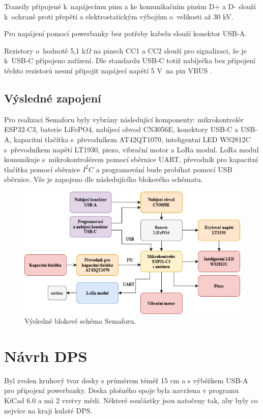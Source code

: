 Transily připojené k~napájecímu pinu a ke komunikačním pinům D+ a D- slouží k~ochraně proti přepětí a elektrostatickým výbojům o~velikosti až 30 kV. 

Pro napájení pomocí powerbanky bez potřeby kabelu slouží konektor USB-A. 

Rezistory o~hodnotě 5,1 k$\Omega$ na pinech CC1 a CC2 slouží pro signalizaci, že je k~USB-C připojeno zařízení. Dle standardu USB-C totiž nabíječka bez 
připojení těchto rezistorů nesmí připojit napájecí napětí 5 V~na pin VBUS \cite{USB-C}. 


\section{Výsledné zapojení}
Pro realizaci Semaforu byly vybrány následující komponenty: mikrokontrolér ESP32-C3, baterie LiFePO4, nabíjecí obvod CN3056E, konektory USB-C a USB-A,
kapacitní tlačítka s~převodníkem AT42QT1070, inteligentní LED WS2812C s~převodníkem napětí LT1930, piezo, vibrační motor a LoRa modul. LoRa modul komunikuje 
s~mikrokontrolérem pomocí sběrnice UART, převodník pro kapacitní tlačítka pomocí sběrnice $I^2C$ a programování bude probíhat pomocí USB sběrnice. Vše je 
zapojeno dle následujícího blokového schématu. 

\begin{figure}[!h]
  \begin{center}
    \includegraphics[scale=0.65]{obrazky/vysledne_blokove_schema.jpg}
  \end{center}
  \caption[Výsledné blokové schéma Semaforu]{Výsledné blokové schéma Semaforu.}
\end{figure}


\chapter{Návrh DPS}
Byl zvolen kruhový tvar desky s průměrem téměř 15 cm a s výběžkem USB-A pro připojení powerbanky. Deska plošného spoje byla navržena v programu KiCad 6.0 a má 2 vrstvy mědi. 
Některé součástky jsou natočeny tak, aby byly co nejvíce na kraji kulaté DPS.

